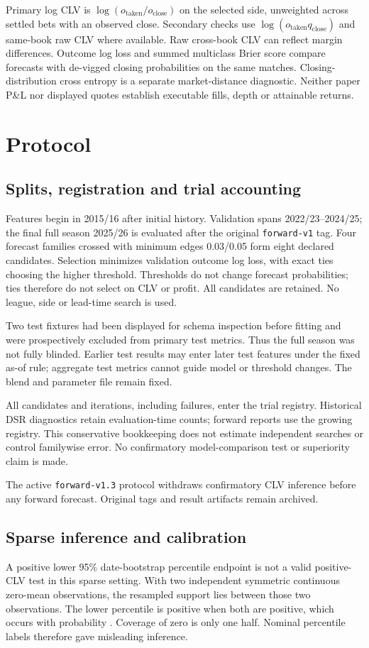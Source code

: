 \documentclass[11pt]{article}
\begin{document}
Primary log CLV is $\log(o_{\mathrm{taken}}/o_{\mathrm{close}})$ on the selected side,
unweighted across settled bets with an observed close. Secondary checks use
$\log(o_{\mathrm{taken}}q_{\mathrm{close}})$ and same-book raw CLV where available. Raw
cross-book CLV can reflect margin differences. Outcome log loss and summed multiclass
Brier score compare forecasts with de-vigged closing probabilities on the same matches.
Closing-distribution cross entropy is a separate market-distance diagnostic. Neither
paper P\&L nor displayed quotes establish executable fills, depth or attainable returns.

\section{Protocol}
\subsection{Splits, registration and trial accounting}
Features begin in 2015/16 after initial history. Validation spans 2022/23--2024/25; the final
full season 2025/26 is evaluated after the original \texttt{forward-v1} tag. Four forecast
families crossed with minimum edges 0.03/0.05 form eight declared candidates. Selection
minimizes validation outcome log loss, with exact ties choosing the higher threshold.
Thresholds do not change forecast probabilities; ties therefore do not select on CLV or
profit. All candidates are retained. No league, side or lead-time search is used.

Two test fixtures had been displayed for schema inspection before fitting and were
prospectively excluded from primary test metrics. Thus the full season was not fully
blinded. Earlier test results may enter later test features under the fixed as-of rule;
aggregate test metrics cannot guide model or threshold changes. The blend and parameter file remain fixed.

All candidates and iterations, including failures, enter the trial registry. Historical
DSR diagnostics retain evaluation-time counts; forward reports use the growing registry.
This conservative bookkeeping does not estimate independent searches or control familywise
error. No confirmatory model-comparison test or superiority claim is made.

The active \texttt{forward-v1.3} protocol withdraws confirmatory CLV inference before any
forward forecast. Original tags and result artifacts remain archived.

\subsection{Sparse inference and calibration}
A positive lower 95\% date-bootstrap percentile endpoint is not a valid positive-CLV
test in this sparse setting. With two independent symmetric continuous zero-mean observations,
the resampled support lies between those two observations. The lower percentile is positive
when both are positive, which occurs with probability \oldNullRate. Coverage of zero is
only one half. Nominal percentile labels therefore gave misleading inference.
\end{document}
